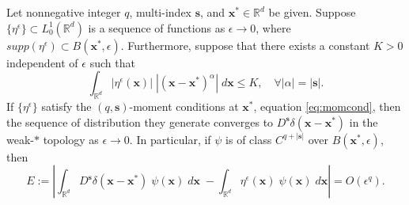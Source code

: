 \begin{theorem}\label{thm:weakconv}
	Let nonnegative integer $q$, multi-index $\mathbf s$, and $\mathbf x^*\in\mathbb R^d$ be given.
	Suppose $\{\eta^\epsilon\}\subset L^1_{0}(\mathbb R^d)$ is a sequence of functions as $\epsilon\to 0$, where $supp(\eta^\epsilon)\subset B(\mathbf x^*,\epsilon)$.
	Furthermore, suppose that there exists a constant $K>0$ independent of $\epsilon$ such that 
	\begin{equation}\label{eq:boundH}
		\int_{\mathbb R^d} |\eta^\epsilon(\mathbf x)|\; |(\mathbf x-\mathbf x^*)^{\alpha}| \; d\mathbf x \le K, \quad \forall |\alpha| = |\mathbf s|.
	\end{equation}
	If $\{\eta^\epsilon\}$ satisfy the $(q,\mathbf s)$-moment conditions at $\mathbf x^*$, equation \ref{eq:momcond}, then the sequence of distribution they generate converges to $D^{\mathbf s}\delta(\mathbf x-\mathbf x^*)$ in the weak-$*$ topology as $\epsilon\to 0$.
	In particular, if $\psi$ is of class $C^{q+|\mathbf s|}$ over $B(\mathbf x^*,\epsilon)$, then
	\begin{equation}\label{eq:delta_error}
		E:= \left| \int_{\mathbb R^d} D^{\mathbf s}\delta(\mathbf x-\mathbf x^*)\;\psi(\mathbf x) \; d\mathbf x\; - 
		\int_{\mathbb R^d} \eta^\epsilon(\mathbf x) \; \psi(\mathbf x)\; d\mathbf x \right| = O(\epsilon^q).
	\end{equation}
\end{theorem}

